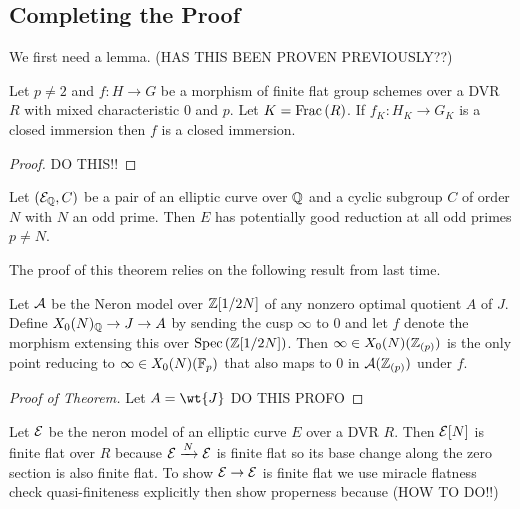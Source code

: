 \documentclass[12pt]{article}
\begin{document}
\subsection{Completing the Proof}

\newcommand{\tors}{\mathrm{tors}}

We first need a lemma. (HAS THIS BEEN PROVEN PREVIOUSLY??)

\begin{prop}
Let $p \neq 2$ and $f : H \to G$ be a morphism of finite flat group schemes over a DVR $R$ with mixed characteristic $0$ and $p$. Let $K = \mathrm{Frac}\left(R\right)$. If $f_K : H_K \to G_K$ is a closed immersion then $f$ is a closed immersion.
\end{prop}

\begin{proof}
DO THIS!!
\end{proof}

\begin{theorem}
Let $(\mathcal{E}_{\mathbb{Q}}, C)$ be a pair of an elliptic curve over $\mathbb{Q}$ and a cyclic subgroup $C$ of order $N$ with $N$ an odd prime. Then $E$ has potentially good reduction at all odd primes $p \neq N$. 
\end{theorem}

The proof of this theorem relies on the following result from last time.

\begin{prop}
Let $\mathcal{A}$ be the Neron model over $\mathbb{Z}[1/2N]$ of any nonzero optimal quotient $A$ of $J$. Define $X_0(N)_{\mathbb{Q}} \to J \to A$ by sending the cusp $\infty$ to $0$ and let $f$ denote the morphism extensing this over $\mathrm{Spec}\left( \mathbb{Z}[1/2N] \right)$. Then $\infty \in X_0(N)(\mathbb{Z}_{(p)})$ is the only point reducing to $\infty \in X_0(N)(\mathbb{F}_p)$ that also maps to $0$ in $\mathcal{A}(\mathbb{Z}_{(p)})$ under $f$.
\end{prop}

\begin{proof}[Proof of Theorem]
Let $A = \wt{J}$ DO THIS PROFO
\end{proof}

\begin{rmk}
Let $\mathcal{E}$ be the neron model of an elliptic curve $E$ over a DVR $R$. Then $\mathcal{E}[N]$ is finite flat over $R$ because $\mathcal{E} \xrightarrow{N} \mathcal{E}$ is finite flat so its base change along the zero section is also finite flat. To show $\mathcal{E} \to \mathcal{E}$ is finite flat we use miracle flatness check quasi-finiteness explicitly then show properness because (HOW TO DO!!)
\end{rmk}
\end{document}
